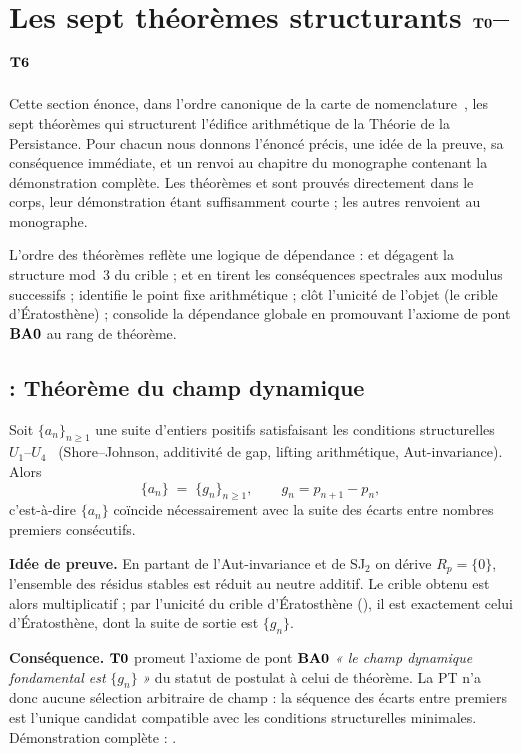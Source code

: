 \section{Les sept théorèmes structurants \texorpdfstring{$\textbf{T0}$--$\textbf{T6}$}{T0-T6}}
\label{sec:theoremes}

Cette section énonce, dans l'ordre canonique de la carte de nomenclature~\cite{PT_Monograph}, les sept théorèmes qui structurent l'édifice arithmétique de la Théorie de la Persistance. Pour chacun nous donnons l'énoncé précis, une idée de la preuve, sa conséquence immédiate, et un renvoi au chapitre du monographe contenant la démonstration complète. Les théorèmes \Ttwo{} et \Tfour{} sont prouvés directement dans le corps, leur démonstration étant suffisamment courte ; les autres renvoient au monographe.

L'ordre des théorèmes reflète une logique de dépendance : \Tone{} et \Tthree{} dégagent la structure mod~$3$ du crible ; \Ttwo{} et \Tfour{} en tirent les conséquences spectrales aux modulus successifs ; \Tfive{} identifie le point fixe arithmétique ; \Tsix{} clôt l'unicité de l'objet (le crible d'Ératosthène) ; \Tzero{} consolide la dépendance globale en promouvant l'axiome de pont $\textbf{BA0}$ au rang de théorème.

\subsection{\Tzero{} : Théorème du champ dynamique}
\label{sec:theoremes:T0}

\begin{theoreme}
\label{thm:T0}
Soit $\{a_n\}_{n \geq 1}$ une suite d'entiers positifs satisfaisant les conditions structurelles $U_1$--$U_4$~\cite[ch.~25]{PT_Monograph} (Shore--Johnson, additivité de gap, lifting arithmétique, Aut-invariance). Alors
\[
\{a_n\} \;=\; \{g_n\}_{n \geq 1}, \qquad g_n = p_{n+1} - p_n,
\]
c'est-à-dire $\{a_n\}$ coïncide nécessairement avec la suite des écarts entre nombres premiers consécutifs.
\end{theoreme}

\textbf{Idée de preuve.} En partant de l'Aut-invariance et de SJ$_2$ on dérive $R_p = \{0\}$, l'ensemble des résidus stables est réduit au neutre additif. Le crible obtenu est alors multiplicatif ; par l'unicité du crible d'Ératosthène (\Tsix), il est exactement celui d'Ératosthène, dont la suite de sortie est $\{g_n\}$.

\textbf{Conséquence.} $\textbf{T0}$ promeut l'axiome de pont $\textbf{BA0}$ \emph{« le champ dynamique fondamental est }$\{g_n\}$\emph{ »} du statut de postulat à celui de théorème. La PT n'a donc aucune sélection arbitraire de champ : la séquence des écarts entre premiers est l'unique candidat compatible avec les conditions structurelles minimales. Démonstration complète : \cite[ch.~25]{PT_Monograph}.

